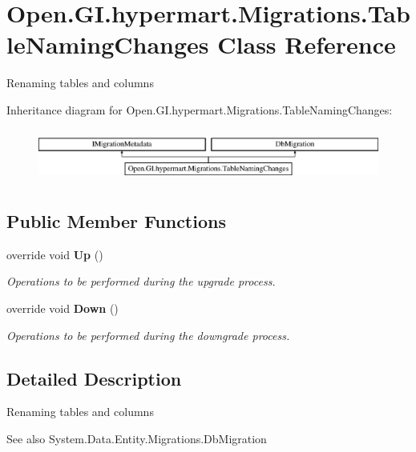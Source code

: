 \section{Open.\+G\+I.\+hypermart.\+Migrations.\+Table\+Naming\+Changes Class Reference}
\label{class_open_1_1_g_i_1_1hypermart_1_1_migrations_1_1_table_naming_changes}


Renaming tables and columns  


Inheritance diagram for Open.\+G\+I.\+hypermart.\+Migrations.\+Table\+Naming\+Changes\+:\begin{figure}[H]
\begin{center}
\leavevmode
\includegraphics[height=1.761006cm]{class_open_1_1_g_i_1_1hypermart_1_1_migrations_1_1_table_naming_changes}
\end{center}
\end{figure}
\subsection*{Public Member Functions}
\begin{DoxyCompactItemize}
\item 
override void {\bf Up} ()
\begin{DoxyCompactList}\small\item\em Operations to be performed during the upgrade process. \end{DoxyCompactList}\item 
override void {\bf Down} ()
\begin{DoxyCompactList}\small\item\em Operations to be performed during the downgrade process. \end{DoxyCompactList}\end{DoxyCompactItemize}


\subsection{Detailed Description}
Renaming tables and columns 

\begin{DoxySeeAlso}{See also}
System.\+Data.\+Entity.\+Migrations.\+Db\+Migration


\end{DoxySeeAlso}


